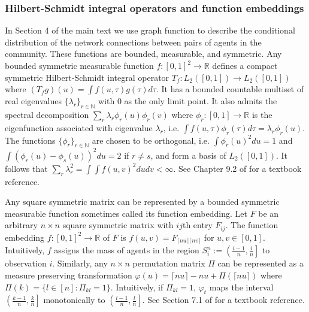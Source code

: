\documentclass[12pt]{article}
\theoremstyle{definition}
\begin{document}
\subsubsection{Hilbert-Schmidt integral operators and function embeddings}
In Section 4 of the main text we use graph function to describe the conditional distribution of the network connections between pairs of agents in the community. These functions are bounded, measurable, and symmetric. Any bounded symmetric measurable function $f: [0,1]^{2}\to \mathbb{R}$ defines a compact symmetric Hilbert-Schmidt integral operator $T_{f}: L_{2}([0,1]) \to L_{2}([0,1])$ where $(T_{f} g)(u) = \int f(u,\tau)g(\tau)d\tau$. It has a bounded countable multiset of real eigenvalues $\{\lambda_{r}\}_{r \in \mathbb{N}}$ with $0$ as the only limit point. It also admits the spectral decomposition $\sum_{r}\lambda_{r}\phi_{r}(u)\phi_{r}(v)$ where $\phi_{r}: [0,1] \to \mathbb{R}$ is the eigenfunction associated with eigenvalue $\lambda_{r}$, i.e. $\int f(u,\tau)\phi_{r}(\tau)d\tau = \lambda_{r}\phi_{r}(u)$. The functions $\{\phi_{r}\}_{r\in \mathbb{N}}$ are chosen to be orthogonal, i.e. $\int \phi_{r}(u)^{2}du = 1$ and $\int(\phi_{r}(u)- \phi_{s}(u))^{2}du = 2$ if $r \neq s$, and form a basis of $L_{2}([0,1])$. It follows that $\sum_{r}\lambda_{r}^{2} = \int\int f(u,v)^{2}dudv <  \infty$. See Chapter 9.2 of \cite{birman2012spectral} for a textbook reference.   

Any square symmetric matrix can be represented by a bounded symmetric measurable function sometimes called its function embedding. Let $F$ be an arbitrary $n\times n$ square symmetric matrix with $ij$th entry $F_{ij}$. The function embedding $f: [0,1]^{2}\to\mathbb{R}$ of $F$  is $f(u,v) = F_{\lceil nu\rceil \lceil nv\rceil}$ for $u,v \in [0,1]$. Intuitively, $f$ assigns the mass of agents in the region $S_{i}^{n} := \left(\frac{i-1}{n},\frac{i}{n}\right]$ to observation $i$.  Similarly, any $n \times n$ permutation matrix $\Pi$ can be represented as a measure preserving transformation $\varphi(u) = \lceil nu \rceil - nu + \Pi(\lceil nu \rceil)$ where $\Pi(k) = \{l \in [n]: \Pi_{kl} = 1\}$. Intuitively, if $\Pi_{kl} = 1$, $\varphi_{t}$ maps the interval $\left(\frac{k-1}{n},\frac{k}{n}\right]$ monotonically to $\left(\frac{l-1}{n},\frac{l}{n}\right]$. See Section 7.1 of \cite{lovasz2012large} for a textbook reference.   
 
\end{document}
